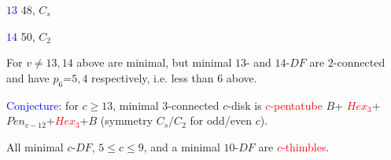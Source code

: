 \documentclass{beamer}
\begin{document}
\begin{frame}
\begin{center}
\begin{minipage}[b]{26mm}
\centering
{}\par
\vspace{-3mm}
\textcolor{blue}{$13$} 48, $C_{s}$
\end{minipage}\vspace{-3mm}
\hspace{-6mm}
\begin{minipage}[b]{26mm}
\centering
{}\par
\vspace{-3mm}
\textcolor{blue}{$14$} 50, $C_{2}$
\end{minipage}
\end{center} 
 


For  $v$$\neq$$13,14$ above are minimal, but  minimal $13$- and $14$-$DF$ are $2$-connected
and have $p_6$=$5,4$ respectively, i.e. less than $6$ above.
\vspace{0.2mm}

\textcolor{blue}{Conjecture}: for $c$$\ge $$13$, 
minimal $3$-connected $c$-disk  is \textcolor{red}{$c$-pentatube}
$B$+\textcolor{red}{
$Hex_3$}+$Pen_{c-12}$+\textcolor{red}{$Hex_3$}+$B$ (symmetry $C_s/C_2$ for odd/even
$c$).
\vspace{0.2mm}

All minimal $c$-$DF$,
$5$$\le$$c$$\le$$9$, and a  minimal $10$-$DF$
 are \textcolor{red}{$c$-thimbles}.
\end{frame}
\end{document}
